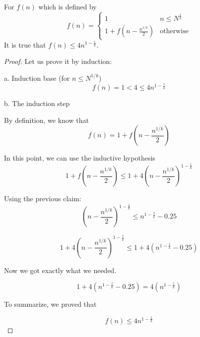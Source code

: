 \begin{claim}
    For $f(n)$ which is defined by \newline
    \begin{equation*}
        f(n) = \begin{cases}
               1               & n \leq N^{\frac{1}{k}}\\
               1 + f(n - \frac{n^{1/k}}{2}) & \text{otherwise}
           \end{cases}
    \end{equation*}
    It is true that $f(n) \leq 4n^{1-\frac{1}{k}}$.
\end{claim}
\begin{proof}
Let us prove it by induction: \newline

a. Induction base (for $n \leq N^{1/k}$)\newline
\begin{equation*}
   f(n) = 1 < 4 \leq 4n^{1-\frac{1}{k}}
\end{equation*}

b. The induction step\newline

By definition, we know that \newline
\begin{equation*}
  f(n) = 1 + f(n - \frac{n^{1/k}}{2})
\end{equation*}

In this point, we can use the inductive hypothesis \newline
\begin{equation*}
  1 + f(n - \frac{n^{1/k}}{2}) \leq 1 + 4(n - \frac{n^{1/k}}{2})^{1-\frac{1}{k}}
\end{equation*}

Using the previous claim:
\begin{equation*}
   (n - \frac{n^{1/k}}{2})^{1-\frac{1}{k}} \leq n^{1-\frac{1}{k}}-0.25
\end{equation*}

\begin{equation*}
  1 + 4(n - \frac{n^{1/k}}{2})^{1-\frac{1}{k}} \leq 1 + 4(n^{1-\frac{1}{k}}-0.25)
\end{equation*}

Now we got exactly what we needed. \newline

\begin{equation*}
  1 + 4(n^{1-\frac{1}{k}}-0.25) = 4(n^{1-\frac{1}{k}})
\end{equation*}

To summarize, we proved that \newline

\begin{equation*}
  f(n) \leq 4n^{1-\frac{1}{k}}
\end{equation*}

\end{proof}
